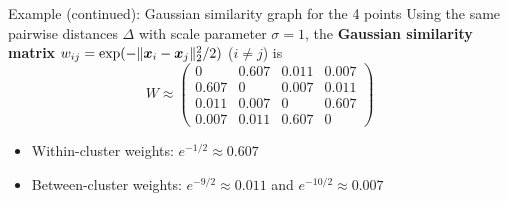 \documentclass[aspectratio=169]{beamer}\usepackage[]{graphicx}\usepackage[]{xcolor}
\begin{document}
\begin{frame}{Example (continued): Gaussian similarity graph for the 4 points}
Using the same pairwise distances $\Delta$ with scale parameter $\sigma = 1$, the \textbf{Gaussian similarity matrix} $w_{ij} = \exp(-\|\bm{x}_i - \bm{x}_j\|_2^2 / 2)$ ($i \neq j$) is
\[
W \approx \begin{pmatrix}
0 & 0.607 & 0.011 & 0.007 \\
0.607 & 0 & 0.007 & 0.011 \\
0.011 & 0.007 & 0 & 0.607 \\
0.007 & 0.011 & 0.607 & 0
\end{pmatrix}
\]
\vfill
\begin{itemize}
\item Within-cluster weights: $e^{-1/2} \approx 0.607$
\item Between-cluster weights: $e^{-9/2} \approx 0.011$ and $e^{-10/2} \approx 0.007$
\end{itemize}
\end{frame}
\end{document}
